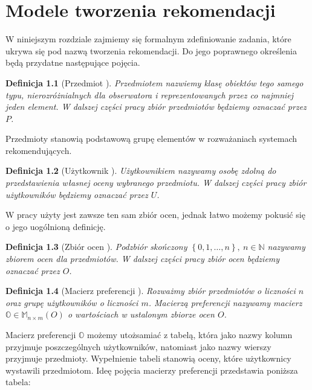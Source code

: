 \documentclass[12pt,a4paper]{report}
\newtheorem{df}{Definicja}[chapter]
\newcommand{\set}[1]{\left\lbrace {#1} \right\rbrace}
\newcommand{\setN}{\mathbb{N}}
\newcommand{\setUzytkownicy}{\mathit{U}}
\newcommand{\setPrzedmioty}{\mathit{P}}
\newcommand{\setOceny}{\mathit{O}}
\begin{document}
\chapter{Modele tworzenia rekomendacji}

W niniejszym rozdziale zajmiemy się formalnym zdefiniowanie zadania, które ukrywa się pod nazwą tworzenia rekomendacji. Do jego poprawnego określenia będą przydatne następujące pojęcia.

\begin{df}[Przedmiot {\citep[Sec 1.3]{kidzinski}}]
 Przedmiotem nazwiemy klasę obiektów tego samego typu, nierozróżnialnych dla obserwatora i reprezentowanych przez co najmniej jeden element. W dalszej części pracy zbiór przedmiotów będziemy oznaczać przez $\setPrzedmioty$.
\end{df}

Przedmioty stanowią podstawową grupę elementów w rozważaniach systemach rekomendujących. 

\begin{df}[Użytkownik {\citep[Sec 1.3]{kidzinski}}]
Użytkownikiem nazywamy osobę zdolną do przedstawienia własnej oceny wybranego przedmiotu. W dalszej części pracy zbiór użytkowników będziemy oznaczać przez $\setUzytkownicy$.
\end{df}

W pracy \citep{kidzinski} użyty jest zawsze ten sam zbiór ocen, jednak łatwo możemy pokusić się o jego uogólnioną definicję.

\begin{df}[Zbiór ocen {\citep[Sec 1.3]{kidzinski}}]
Podzbiór skończony $\set{0,1, \ldots, n}, \: n\in \setN$ nazywamy zbiorem ocen dla przedmiotów. W dalszej części pracy zbiór ocen będziemy oznaczać przez $\setOceny$.
\end{df} 

\begin{df}[Macierz preferencji {\citep[Sec 1.3]{kidzinski}}]
Rozważmy zbiór przedmiotów o liczności $n$ oraz grupę użytkowników o liczności $m$. Macierzą preferencji nazywamy macierz $\mathbb{O} \in \mathbb{M}_{n \times m}(\setOceny)$ o wartościach w ustalonym zbiorze ocen $\setOceny$.
\end{df}

Macierz preferencji $\mathbb{O}$ możemy utożsamiać z tabelą, która jako nazwy kolumn przyjmuje poszczególnych użytkowników, natomiast jako nazwy wierszy przyjmuje przedmioty. Wypełnienie tabeli stanowią oceny, które użytkownicy wystawili przedmiotom. Ideę pojęcia macierzy preferencji przedstawia poniższa tabela:
\end{document}
